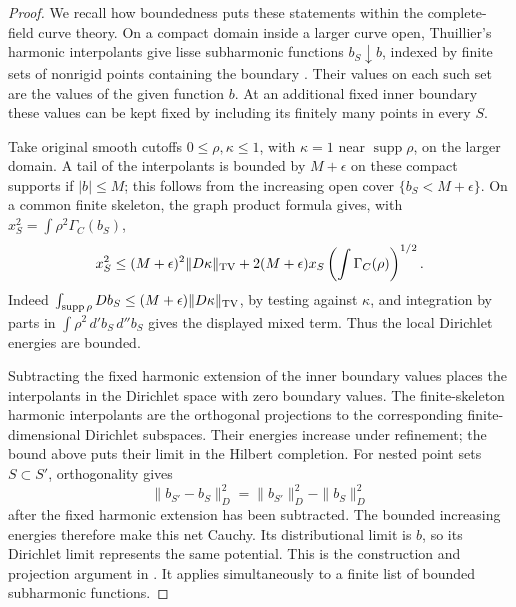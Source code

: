 \documentclass[11pt,reqno]{amsart}
\theoremstyle{definition}
\theoremstyle{remark}
\numberwithin{equation}{section}
\newcommand{\supp}{\operatorname{supp}}
\begin{document}
\begin{proof}
We recall how boundedness puts these statements within the
complete-field curve theory. On a compact domain inside a larger
curve open, Thuillier's harmonic interpolants give lisse
subharmonic functions \(b_S\downarrow b\), indexed by finite sets
of nonrigid points containing the boundary
\cite[Theorem~3.4.2]{Thuillier}. Their values on each such set are
the values of the given function \(b\). At an additional fixed inner boundary
these values can be kept fixed by including its finitely many
points in every \(S\).

Take original smooth cutoffs \(0\leq\rho,\kappa\leq1\), with
\(\kappa=1\) near \(\supp\rho\), on the larger domain. A tail of the
interpolants is bounded by \(M+\epsilon\) on these compact supports
if \(|b|\leq M\); this follows from the increasing open cover
\(\{b_S<M+\epsilon\}\). On a common finite skeleton, the graph
product formula gives, with \(x_S^2=\int\rho^2\Gamma_C(b_S)\),
\begin{equation}\label{eq:curve-local-energy-bound}
 x_S^2\leq (M+\epsilon)^2\|D\kappa\|_{\rm TV}
       +2(M+\epsilon)x_S
                       \left(\int\Gamma_C(\rho)\right)^{1/2}.
\end{equation}
Indeed \(\int_{\supp\rho}Db_S\leq
(M+\epsilon)\|D\kappa\|_{\rm TV}\), by testing against \(\kappa\),
and integration by parts in
\(\int \rho^2\,d'b_S\,d''b_S\) gives the displayed mixed term.
Thus the local Dirichlet energies are bounded.

Subtracting the fixed harmonic extension of the inner boundary
values places the interpolants in the Dirichlet space with zero
boundary values. The finite-skeleton harmonic interpolants are the
orthogonal projections to the corresponding finite-dimensional
Dirichlet subspaces. Their energies increase under refinement;
the bound above puts their limit in the Hilbert completion.
For nested point sets $S\subset S'$, orthogonality gives
\[
 \|b_{S'}-b_S\|_D^2
       =\|b_{S'}\|_D^2-\|b_S\|_D^2
\]
after the fixed harmonic extension has been subtracted. The
bounded increasing energies therefore make this net Cauchy. Its
distributional limit is $b$, so its Dirichlet limit represents the
same potential. This is the construction and
projection argument in \cite[\S3.5, especially Lemma~3.5.3 and the
discussion following it]{Thuillier}. It applies simultaneously to
a finite list of bounded subharmonic functions.


\end{proof}
\end{document}
